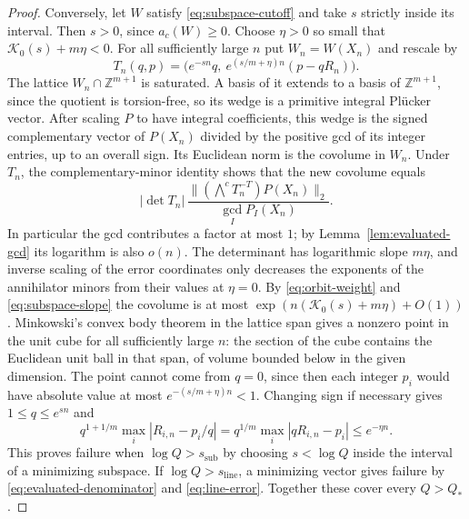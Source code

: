 \documentclass[11pt,a4paper,reqno]{amsart}
\theoremstyle{definition}
\theoremstyle{remark}
\numberwithin{equation}{section}
\begin{document}
\begin{proof}
Conversely, let \(W\) satisfy \eqref{eq:subspace-cutoff} and
take \(s\) strictly inside its interval. Then \(s>0\), since
\(a_c(W)\ge0\). Choose \(\eta>0\) so small that
\(\mathcal K_0(s)+m\eta<0\). For all sufficiently large \(n\)
put \(W_n=W(X_n)\) and rescale by
\[
 T_n(q,p)=\big(e^{-sn}q,\ e^{(s/m+\eta)n}(p-qR_n)\big).
\]
The lattice \(W_n\cap\mathbb Z^{m+1}\) is saturated.
A basis of it extends to a basis of \(\mathbb Z^{m+1}\), since the
quotient is torsion-free, so its wedge is a primitive integral
Pl\"ucker vector. After scaling \(P\) to have integral coefficients,
this wedge is the signed complementary vector of \(P(X_n)\)
divided by the positive gcd of its integer entries, up to an
overall sign. Its Euclidean norm is the covolume in \(W_n\).
Under \(T_n\), the complementary-minor identity shows that
the new covolume equals
\[
 |\det T_n|\,
 \frac{\big\|(\bigwedge^c T_n^{-T})P(X_n)\big\|_2}
      {\gcd_I P_I(X_n)} .
\]
In particular the gcd contributes a factor at most \(1\);
by Lemma~\ref{lem:evaluated-gcd} its logarithm is also \(o(n)\).
The determinant has logarithmic slope \(m\eta\), and inverse
scaling of the error coordinates only decreases the exponents
of the annihilator minors from their values at \(\eta=0\).
By \eqref{eq:orbit-weight} and \eqref{eq:subspace-slope} the
covolume is at most \(\exp(n(\mathcal K_0(s)+m\eta)+O(1))\).
Minkowski's convex body theorem in the lattice span gives a
nonzero point in the unit cube for all sufficiently large \(n\):
the section of the cube contains the Euclidean unit ball in
that span, of volume bounded below in the given dimension.
The point cannot come from \(q=0\), since then each integer
\(p_i\) would have absolute value at most \(e^{-(s/m+\eta)n}<1\).
Changing sign if necessary gives \(1\le q\le e^{sn}\) and
\[
 q^{1+1/m}\max_i|R_{i,n}-p_i/q|
     =q^{1/m}\max_i|qR_{i,n}-p_i|\le e^{-\eta n}.
\]
This proves failure when \(\log Q>s_{\mathrm{sub}}\) by choosing
\(s<\log Q\) inside the interval of a minimizing subspace.
If \(\log Q>s_{\mathrm{line}}\), a minimizing vector gives
failure by \eqref{eq:evaluated-denominator} and
\eqref{eq:line-error}. Together these cover every \(Q>Q_*\).


\end{proof}
\end{document}
